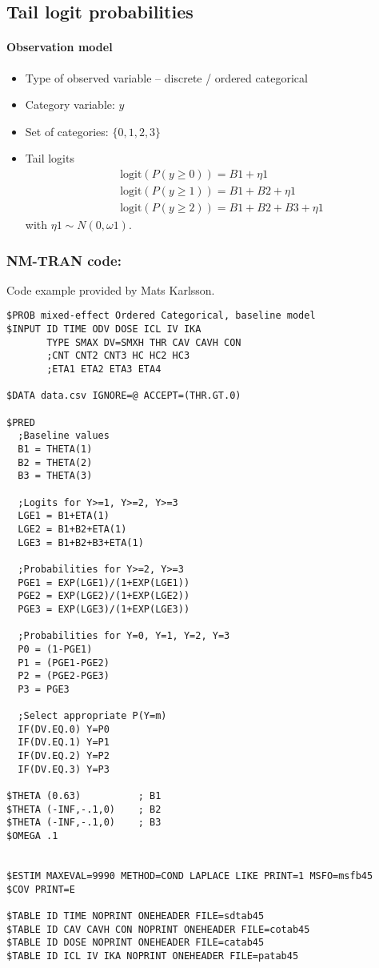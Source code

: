 \subsection{Tail logit probabilities}

\paragraph{Observation model}

\begin{itemize}
\item
Type of observed variable -- discrete / ordered categorical
\item
Category variable: $y$
\item
Set of categories: $\{0,1,2,3\}$
\item
Tail logits
\begin{align}
& \text{logit}(P(y \ge 0)) = B1 + \eta1 \nonumber \\
& \text{logit}(P(y \ge 1)) = B1 + B2 + \eta1 \nonumber \\
& \text{logit}(P(y \ge 2)) = B1 + B2 + B3 + \eta1 \nonumber 
\end{align}
with $\eta1 \sim N(0, \omega1)$.
\end{itemize}


\subsubsection{NM-TRAN code:}
Code example provided by Mats Karlsson.

\myStartLine

\lstset{language=NONMEMdataSet}
\begin{lstlisting}
$PROB mixed-effect Ordered Categorical, baseline model
$INPUT ID TIME ODV DOSE ICL IV IKA 
       TYPE SMAX DV=SMXH THR CAV CAVH CON
       ;CNT CNT2 CNT3 HC HC2 HC3 
       ;ETA1 ETA2 ETA3 ETA4

$DATA data.csv IGNORE=@ ACCEPT=(THR.GT.0)

$PRED
  ;Baseline values
  B1 = THETA(1)
  B2 = THETA(2)
  B3 = THETA(3)

  ;Logits for Y>=1, Y>=2, Y>=3
  LGE1 = B1+ETA(1)
  LGE2 = B1+B2+ETA(1)
  LGE3 = B1+B2+B3+ETA(1)

  ;Probabilities for Y>=2, Y>=3
  PGE1 = EXP(LGE1)/(1+EXP(LGE1))
  PGE2 = EXP(LGE2)/(1+EXP(LGE2))
  PGE3 = EXP(LGE3)/(1+EXP(LGE3))

  ;Probabilities for Y=0, Y=1, Y=2, Y=3
  P0 = (1-PGE1) 
  P1 = (PGE1-PGE2)
  P2 = (PGE2-PGE3)
  P3 = PGE3   
 
  ;Select appropriate P(Y=m)
  IF(DV.EQ.0) Y=P0
  IF(DV.EQ.1) Y=P1
  IF(DV.EQ.2) Y=P2
  IF(DV.EQ.3) Y=P3

$THETA (0.63)          ; B1
$THETA (-INF,-.1,0)    ; B2
$THETA (-INF,-.1,0)    ; B3
$OMEGA .1


$ESTIM MAXEVAL=9990 METHOD=COND LAPLACE LIKE PRINT=1 MSFO=msfb45
$COV PRINT=E

$TABLE ID TIME NOPRINT ONEHEADER FILE=sdtab45
$TABLE ID CAV CAVH CON NOPRINT ONEHEADER FILE=cotab45
$TABLE ID DOSE NOPRINT ONEHEADER FILE=catab45
$TABLE ID ICL IV IKA NOPRINT ONEHEADER FILE=patab45
\end{lstlisting}

